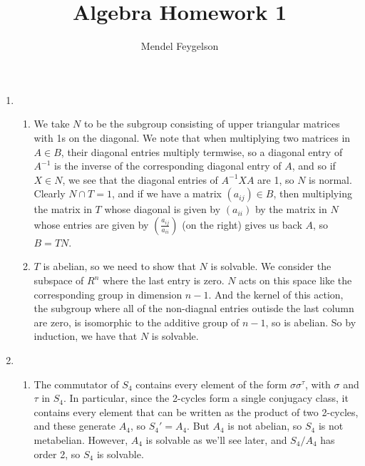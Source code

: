 \documentclass{article}
\title{Algebra Homework 1}
\author{Mendel Feygelson}
\begin{document}
\maketitle
\begin{enumerate}

   \item
      \begin{enumerate}

         \item We take $N$ to be the subgroup consisting of upper triangular
            matrices with 1s on the diagonal. We note that when multiplying two
            matrices in $A \in B$, their diagonal entries multiply termwise, so
            a diagonal entry of $A^{-1}$ is the inverse of the corresponding
            diagonal entry of $A$, and so if $X \in N$, we see that the diagonal
            entries of $A^{-1}XA$ are 1, so $N$ is normal. Clearly $N \cap T =
            1$, and if we have a matrix $(a_{ij}) \in B$, then multiplying the
            matrix in $T$ whose diagonal is given by $(a_{ii})$ by the matrix in
            $N$ whose entries are given by $(\frac{a_{ij}}{a_{ii}})$ (on the
            right) gives us back $A$, so $B = TN$.

         \item $T$ is abelian, so we need to show that $N$ is solvable. We
            consider the subspace of $R^n$ where the last entry is zero. $N$
            acts on this space like the corresponding group in dimension $n-1$.
            And the kernel of this action, the subgroup where all of the
            non-diagnal entries outisde the last column are zero, is isomorphic
            to the additive group of $n-1$, so is abelian. So by induction, we
            have that $N$ is solvable.

      \end{enumerate}

   \item 
      \begin{enumerate}

         \item The commutator of $S_4$ contains every element of the form
            $\sigma\sigma^\tau$, with $\sigma$ and $\tau$ in $S_4$. In
            particular, since the 2-cycles form a single conjugacy class, it
            contains every element that can be written as the product of two
            2-cycles, and these generate $A_4$, so $S_4' = A_4$. But $A_4$ is
            not abelian, so $S_4$ is not metabelian. However, $A_4$ is solvable
            as we'll see later, and $S_4/A_4$ has order 2, so $S_4$ is solvable.
         

\end{enumerate}
\end{enumerate}
\end{document}
